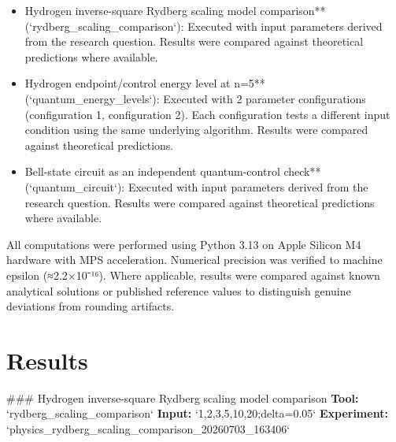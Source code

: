 \documentclass[11pt,a4paper]{article}
\begin{document}
\begin{itemize}
\item Hydrogen inverse-square Rydberg scaling model comparison** (`rydberg\_scaling\_comparison`): Executed with input parameters derived from the research question. Results were compared against theoretical predictions where available.
\item Hydrogen endpoint/control energy level at n=5** (`quantum\_energy\_levels`): Executed with 2 parameter configurations (configuration 1, configuration 2). Each configuration tests a different input condition using the same underlying algorithm. Results were compared against theoretical predictions.
\item Bell-state circuit as an independent quantum-control check** (`quantum\_circuit`): Executed with input parameters derived from the research question. Results were compared against theoretical predictions where available.
\end{itemize}
All computations were performed using Python 3.13 on Apple Silicon M4 hardware with MPS acceleration. Numerical precision was verified to machine epsilon (≈2.2×10⁻¹⁶). Where applicable, results were compared against known analytical solutions or published reference values to distinguish genuine deviations from rounding artifacts.


\section{Results}
\#\#\# Hydrogen inverse-square Rydberg scaling model comparison
\textbf{Tool:} `rydberg\_scaling\_comparison`
\textbf{Input:} `1,2,3,5,10,20;delta=0.05`
\textbf{Experiment:} `physics\_rydberg\_scaling\_comparison\_20260703\_163406`
\end{document}
